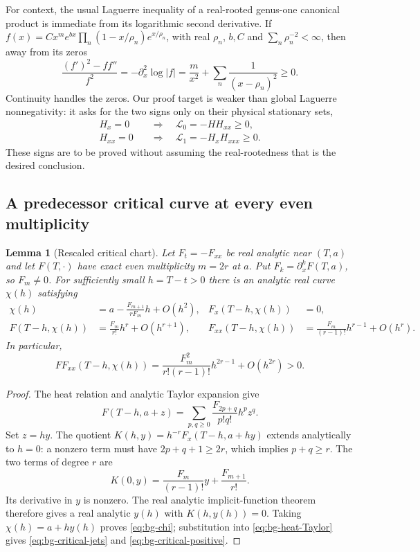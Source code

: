 \documentclass[11pt]{article}
\numberwithin{equation}{section}
\newtheorem{lemma}[theorem]{Lemma}
\theoremstyle{definition}
\theoremstyle{remark}
\begin{document}
For context, the usual Laguerre inequality of a real-rooted
genus-one canonical product is immediate from its logarithmic second
derivative. If
$f(x)=C x^m e^{bx}\prod_n(1-x/\rho_n)e^{x/\rho_n}$, with real
$\rho_n$, $b,C$ and $\sum_n\rho_n^{-2}<\infty$, then away from its
zeros
\begin{equation}
 \frac{(f')^2-ff''}{f^2}
 =-\partial_x^2\log|f|
 =\frac m{x^2}+\sum_n\frac1{(x-\rho_n)^2}\ge0.
 \label{eq:bg-real-root-Laguerre}
\end{equation}
Continuity handles the zeros. Our proof target is weaker than global
Laguerre nonnegativity: it asks for the two signs only on their physical
stationary sets,
\begin{align}
 H_x=0&\quad\Longrightarrow\quad\mathscr L_0=-HH_{xx}\ge0,
 \label{eq:bg-S0}\\
 H_{xx}=0&\quad\Longrightarrow\quad\mathscr L_1=-H_xH_{xxx}\ge0.
 \label{eq:bg-S1}
\end{align}
These signs are to be proved without assuming the real-rootedness that
is the desired conclusion.

\subsection{A predecessor critical curve at every even multiplicity}

\begin{lemma}[Rescaled critical chart]
\label{lem:bg-predecessor}
Let $F_t=-F_{xx}$ be real analytic near $(T,a)$ and let $F(T,\cdot)$
have exact even multiplicity $m=2r$ at $a$. Put
$F_k=\partial_x^kF(T,a)$, so $F_m\ne0$. For sufficiently small
$h=T-t>0$ there is an analytic real curve $\chi(h)$ satisfying
\begin{align}
 \chi(h)&=a-\frac{F_{m+1}}{rF_m}h+O(h^2),
 &F_x(T-h,\chi(h))&=0,\label{eq:bg-chi}\\
 F(T-h,\chi(h))&=\frac{F_m}{r!}h^r+O(h^{r+1}),
 &F_{xx}(T-h,\chi(h))&=
 \frac{F_m}{(r-1)!}h^{r-1}+O(h^r).
 \label{eq:bg-critical-jets}
\end{align}
In particular,
\begin{equation}
 FF_{xx}(T-h,\chi(h))=
 \frac{F_m^2}{r!(r-1)!}h^{2r-1}+O(h^{2r})>0.
 \label{eq:bg-critical-positive}
\end{equation}
\end{lemma}
\begin{proof}
The heat relation and analytic Taylor expansion give
\begin{equation}
 F(T-h,a+z)=\sum_{p,q\ge0}
 \frac{F_{2p+q}}{p!q!}h^pz^q.
 \label{eq:bg-heat-Taylor}
\end{equation}
Set $z=hy$. The quotient
$K(h,y)=h^{-r}F_x(T-h,a+hy)$ extends analytically to $h=0$:
a nonzero term must have $2p+q+1\ge2r$, which implies $p+q\ge r$.
The two terms of degree $r$ are
\[
 K(0,y)=\frac{F_m}{(r-1)!}y+\frac{F_{m+1}}{r!}.
\]
Its derivative in $y$ is nonzero. The real analytic implicit-function
theorem therefore gives a real analytic $y(h)$ with $K(h,y(h))=0$.
Taking $\chi(h)=a+hy(h)$ proves \eqref{eq:bg-chi}; substitution into
\eqref{eq:bg-heat-Taylor} gives \eqref{eq:bg-critical-jets} and
\eqref{eq:bg-critical-positive}.
\end{proof}
\end{document}
